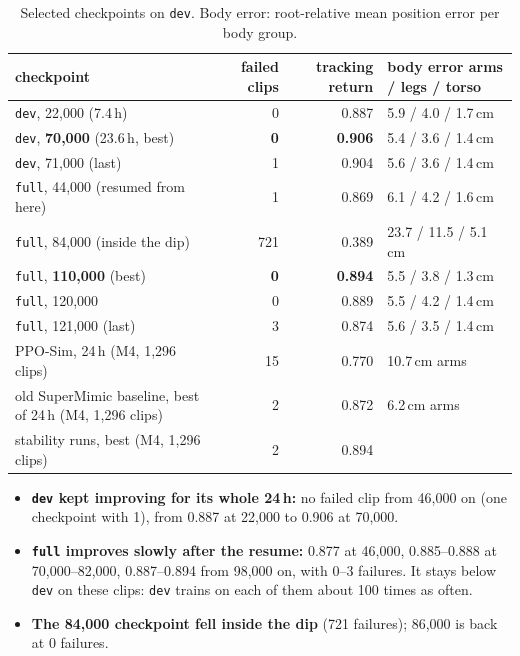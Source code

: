 \documentclass[10pt]{article}
\begin{document}
\begin{table}[H]
\centering\small
\caption{Selected checkpoints on \texttt{dev}. Body error: root-relative mean position error per body group.}
\label{tab:bench}
\begin{tabular}{@{}lrrl@{}}\toprule
checkpoint & failed clips & tracking return & body error arms / legs / torso \\\midrule
\texttt{dev}, 22,000 (7.4\,h) & 0 & 0.887 & 5.9 / 4.0 / 1.7\,cm \\
\texttt{dev}, \textbf{70,000} (23.6\,h, best) & \textbf{0} & \textbf{0.906} & 5.4 / 3.6 / 1.4\,cm \\
\texttt{dev}, 71,000 (last) & 1 & 0.904 & 5.6 / 3.6 / 1.4\,cm \\
\texttt{full}, 44,000 (resumed from here) & 1 & 0.869 & 6.1 / 4.2 / 1.6\,cm \\
\texttt{full}, 84,000 (inside the dip) & 721 & 0.389 & 23.7 / 11.5 / 5.1\,cm \\
\texttt{full}, \textbf{110,000} (best) & \textbf{0} & \textbf{0.894} & 5.5 / 3.8 / 1.3\,cm \\
\texttt{full}, 120,000 & 0 & 0.889 & 5.5 / 4.2 / 1.4\,cm \\
\texttt{full}, 121,000 (last) & 3 & 0.874 & 5.6 / 3.5 / 1.4\,cm \\\midrule
PPO-Sim, 24\,h (M4, 1,296 clips) & 15 & 0.770 & 10.7\,cm arms \\
old SuperMimic baseline, best of 24\,h (M4, 1,296 clips) & 2 & 0.872 & 6.2\,cm arms \\
stability runs, best (M4, 1,296 clips) & 2 & 0.894 & \\
\bottomrule
\end{tabular}
\end{table}

\begin{itemize}
  \item \textbf{\texttt{dev} kept improving for its whole 24\,h:} no failed clip from 46,000 on (one
  checkpoint with 1), from 0.887 at 22,000 to 0.906 at 70,000.
  \item \textbf{\texttt{full} improves slowly after the resume:} 0.877 at 46,000, 0.885--0.888 at
  70,000--82,000, 0.887--0.894 from 98,000 on, with 0--3 failures. It stays below \texttt{dev} on these clips:
  \texttt{dev} trains on each of them about 100 times as often.
  \item \textbf{The 84,000 checkpoint fell inside the dip} (721 failures); 86,000 is back at 0 failures.
\end{itemize}
\end{document}
